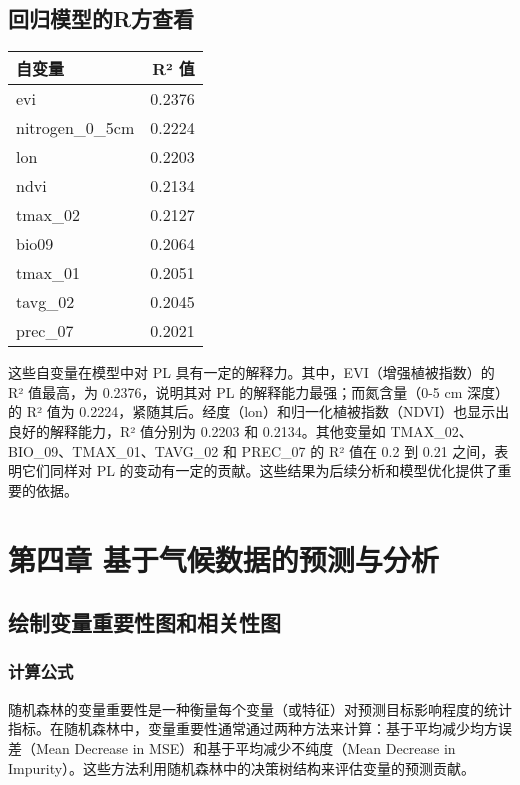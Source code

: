\documentclass{article}
\begin{document}
	\subsection{回归模型的R方查看}
\begin{table}

	\begin{tabular}{lr}
		\toprule
		\textbf{自变量} & \textbf{R² 值} \\ \midrule
		evi & 0.2376 \\ 
		nitrogen\_0\_5cm & 0.2224 \\ 
		lon & 0.2203 \\ 
		ndvi & 0.2134 \\ 
		tmax\_02 & 0.2127 \\ 
		bio09 & 0.2064 \\ 
		tmax\_01 & 0.2051 \\ 
		tavg\_02 & 0.2045 \\ 
		prec\_07 & 0.2021 \\ 
		\bottomrule
	\end{tabular}

	

\end{table}
这些自变量在模型中对 PL 具有一定的解释力。其中，EVI（增强植被指数）的 R² 值最高，为 0.2376，说明其对 PL 的解释能力最强；而氮含量（0-5 cm 深度）的 R² 值为 0.2224，紧随其后。经度（lon）和归一化植被指数（NDVI）也显示出良好的解释能力，R² 值分别为 0.2203 和 0.2134。其他变量如 TMAX\_02、BIO\_09、TMAX\_01、TAVG\_02 和 PREC\_07 的 R² 值在 0.2 到 0.21 之间，表明它们同样对 PL 的变动有一定的贡献。这些结果为后续分析和模型优化提供了重要的依据。




	\section{第四章 基于气候数据的预测与分析}
	
	\subsection{绘制变量重要性图和相关性图}
	
	
	\subsubsection{计算公式}
	随机森林的变量重要性是一种衡量每个变量（或特征）对预测目标影响程度的统计指标。在随机森林中，变量重要性通常通过两种方法来计算：基于平均减少均方误差（Mean Decrease in MSE）和基于平均减少不纯度（Mean Decrease in Impurity）。这些方法利用随机森林中的决策树结构来评估变量的预测贡献。
	
\end{document}
